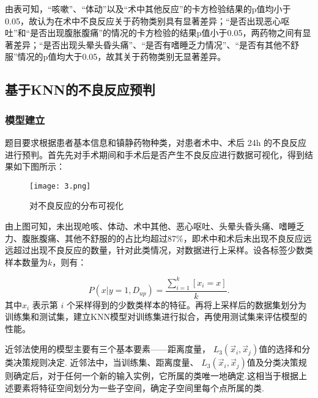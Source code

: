由表可知，“咳嗽”、“体动”以及“术中其他反应”的卡方检验结果的p值均小于0.05，故认为在术中不良反应关于药物类别具有显著差异；“是否出现恶心呕吐”和“是否出现腹胀腹痛”的情况的卡方检验的结果p值小于0.05，两药物之间有显著差异；“是否出现头晕头昏头痛”、“是否有嗜睡乏力情况”、“是否有其他不舒服”情况的p值均大于0.05，故其关于药物类别无显著差异。


\subsection{基于KNN的不良反应预判}

\subsubsection{模型建立}

题目要求根据患者基本信息和镇静药物种类，对患者术中、术后 24h 的不良反应进行预判。首先先对手术期间和手术后是否产生不良反应进行数据可视化，得到结果如下图所示：

\begin{figure}[H] %
	\centering %
	\texttt{[image: 3.png]} 
	\caption{对不良反应的分布可视化} 
	\label{Fig.main3} 
\end{figure}

由上图可知，未出现呛咳、体动、术中其他、恶心呕吐、头晕头昏头痛、嗜睡乏力、腹胀腹痛、其他不舒服的的占比均超过87\%，即术中和术后未出现不良反应远远超过出现不良反应的数量，针对此类情况，对数据进行上采样。设各标签少数类样本数量为$k$，则有：

\begin{equation}
    P(x|y=1,D_{up}) = \dfrac{\sum_{i=1}^{k} [x_i=x]}{k}.
\end{equation}
其中$x_i$ 表示第 $i$ 个采样得到的少数类样本的特征。再将上采样后的数据集划分为训练集和测试集，建立KNN模型对训练集进行拟合，再使用测试集来评估模型的性能。

近邻法使用的模型主要有三个基本要素——距离度量， ${{L}_{3}}\left( {{\overrightarrow{x}}_{i}},{{\overrightarrow{x}}_{j}} \right)$值的选择和分类决策规则决定. 近邻法中，当训练集、距离度量、 ${{L}_{3}}\left( {{\overrightarrow{x}}_{i}},{{\overrightarrow{x}}_{j}} \right)$值及分类决策规则确定后，对于任何一个新的输入实例，它所属的类唯一地确定.这相当于根据上述要素将特征空间划分为一些子空间，确定子空间里每个点所属的类.

